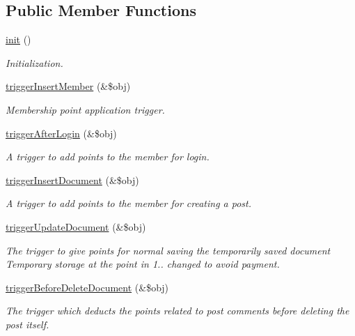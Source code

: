 \subsection*{Public Member Functions}
\begin{DoxyCompactItemize}
\item 
\hyperlink{classpointController_af1b29c5e35e5ab0f5ec004757908c1fe}{init} ()
\begin{DoxyCompactList}\small\item\em Initialization. \end{DoxyCompactList}\item 
\hyperlink{classpointController_a98cfacf9f4a7d0d3f5d0d692ba6d8dc3}{trigger\+Insert\+Member} (\&\$obj)
\begin{DoxyCompactList}\small\item\em Membership point application trigger. \end{DoxyCompactList}\item 
\hyperlink{classpointController_aa0a463b222d4980e729e27e104e11f43}{trigger\+After\+Login} (\&\$obj)
\begin{DoxyCompactList}\small\item\em A trigger to add points to the member for login. \end{DoxyCompactList}\item 
\hyperlink{classpointController_aba87f873c4b2d31e70a9b326e1e6e753}{trigger\+Insert\+Document} (\&\$obj)
\begin{DoxyCompactList}\small\item\em A trigger to add points to the member for creating a post. \end{DoxyCompactList}\item 
\hyperlink{classpointController_a05fba328c369a12065cba849e5c0539c}{trigger\+Update\+Document} (\&\$obj)
\begin{DoxyCompactList}\small\item\em The trigger to give points for normal saving the temporarily saved document Temporary storage at the point in 1.. changed to avoid payment. \end{DoxyCompactList}\item 
\hyperlink{classpointController_a6773e89c36c2ad9086f1e4628149123c}{trigger\+Before\+Delete\+Document} (\&\$obj)
\begin{DoxyCompactList}\small\item\em The trigger which deducts the points related to post comments before deleting the post itself. \end{DoxyCompactList}\item 

\end{DoxyCompactItemize}
